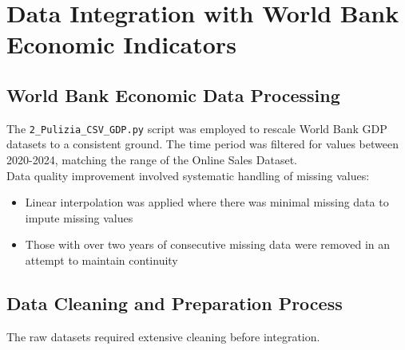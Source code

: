 \documentclass[a4paper,11pt]{article}
\begin{document}
\section{Data Integration with World Bank Economic Indicators}

\subsection{World Bank Economic Data Processing}

The \texttt{2\_Pulizia\_CSV\_GDP.py} script was employed to rescale World Bank GDP datasets to a consistent ground. 
The time period was filtered for values between 2020-2024, matching the range of the Online Sales Dataset. \\
Data quality improvement involved systematic handling of missing values:
\begin{itemize}
    \item Linear interpolation was applied where there was minimal missing data to impute missing values
    \item Those with over two years of consecutive missing data were removed in an attempt to maintain continuity
\end{itemize}

\subsection{Data Cleaning and Preparation Process}

The raw datasets required extensive cleaning before integration.
\end{document}

